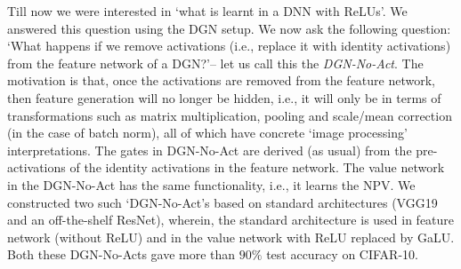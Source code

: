 Till now we were interested in `what is learnt in a DNN with ReLUs'. We answered this question using the DGN setup.  We now ask the following question: `What happens if we remove activations (i.e., replace it with identity activations) from the feature network of a DGN?'-- let us call this the \emph{DGN-No-Act}. The motivation is that, once the activations are removed from the feature network, then feature generation will no longer be hidden, i.e., it will only be in terms of transformations such as matrix multiplication, pooling and scale/mean correction (in the case of batch norm), all of which have concrete `image processing'  interpretations. The gates in DGN-No-Act are derived (as usual) from the pre-activations of the identity activations in the feature network. The value network in the DGN-No-Act has the same functionality, i.e., it learns the NPV. We constructed two such `DGN-No-Act's based on standard architectures (VGG19 and an off-the-shelf ResNet), wherein, the standard architecture is used in feature network (without ReLU) and in the value network with ReLU replaced by GaLU. Both these DGN-No-Acts gave more than $90\%$ test accuracy on CIFAR-10.

